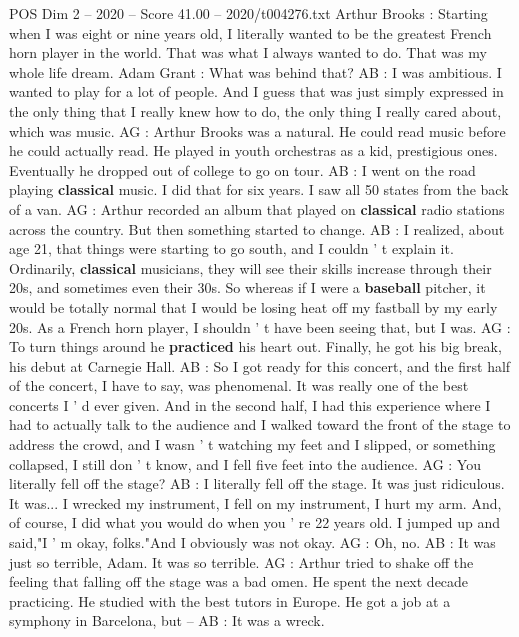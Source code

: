 \begin{textsample}{POS Dim 2 – 2020 – Score 41.00 – 2020/t004276.txt}  \label{ex:f2_pos_009}
Arthur Brooks : Starting when I was eight or nine years old, I literally wanted to be the greatest French horn player in the world.
That was what I always wanted to do.
That was my whole life dream.
Adam Grant : What was behind that?
AB : I was ambitious.
I wanted to play for a lot of people.
And I guess that was just simply expressed in the only thing that I really knew how to do, the only thing I really cared about, which was music.
AG : Arthur Brooks was a natural.
He could read music before he could actually read.
He played in youth orchestras as a kid, prestigious ones.
Eventually he dropped out of college to go on tour.
AB : I went on the road playing \textbf{classical} music.
I did that for six years.
I saw all 50 states from the back of a van.
AG : Arthur recorded an album that played on \textbf{classical} radio stations across the country.
But then something started to change.
AB : I realized, about age 21, that things were starting to go south, and I couldn ' t explain it.
Ordinarily, \textbf{classical} musicians, they will see their skills increase through their 20s, and sometimes even their 30s.
So whereas if I were a \textbf{baseball} pitcher, it would be totally normal that I would be losing heat off my fastball by my early 20s.
As a French horn player, I shouldn ' t have been seeing that, but I was.
AG : To turn things around he \textbf{practiced} his heart out.
Finally, he got his big break, his debut at Carnegie Hall.
AB : So I got ready for this concert, and the first half of the concert, I have to say, was phenomenal.
It was really one of the best concerts I ' d ever given.
And in the second half, I had this experience where I had to actually talk to the audience and I walked toward the front of the stage to address the crowd, and I wasn ' t watching my feet and I slipped, or something collapsed, I still don ' t know, and I fell five feet into the audience.
AG : You literally fell off the stage?
AB : I literally fell off the stage.
It was just ridiculous.
It was...
I wrecked my instrument, I fell on my instrument, I hurt my arm.
And, of course, I did what you would do when you ' re 22 years old.
I jumped up and said,"I ' m okay, folks."And I obviously was not okay.
AG : Oh, no.
AB : It was just so terrible, Adam.
It was so terrible.
AG : Arthur tried to shake off the feeling that falling off the stage was a bad omen.
He spent the next decade practicing.
He studied with the best tutors in Europe.
He got a job at a symphony in Barcelona, but -- AB : It was a wreck.

\end{textsample}
